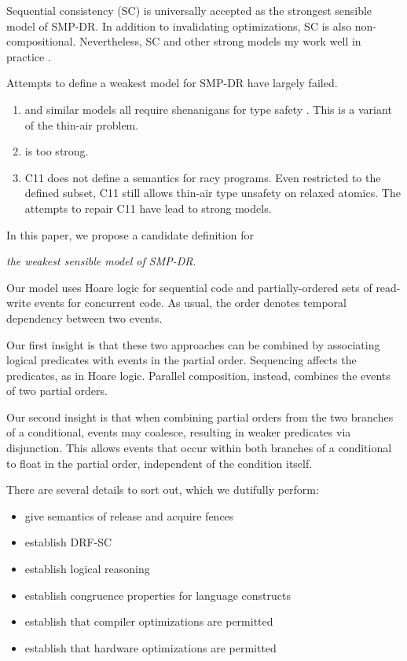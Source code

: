 Sequential consistency (SC) \citep{Lamport:1979:MMC:1311099.1311750} is
universally accepted as the strongest sensible model of SMP-DR.  In addition
to invalidating optimizations, SC is also non-compositional.  Nevertheless,
SC and other strong models my work well in practice
\cite{Singh:2012:ESC:2337159.2337220,Dolan:2018:BDR:3192366.3192421,Ou:2018:TUC:3288538.3276506,Liu:2019:ASC:3314221.3314611}.

Attempts to define a weakest model for SMP-DR have largely failed.
\begin{enumerate}
\item \citet{Manson:2005:JMM:1047659.1040336} and similar models
  \cite{DBLP:conf/esop/JagadeesanPR10,DBLP:conf/popl/KangHLVD17} all require
  shenanigans for type safety
  \cite{DBLP:journals/toplas/Lochbihler13,DBLP:conf/tldi/GotoJPR12}.  This is
  a variant of the thin-air problem.
\item \citet{DBLP:conf/lics/JeffreyR16} is too strong.
\item C11 does not define a semantics for racy programs.  Even restricted to
  the defined subset, C11 still allows thin-air type unsafety on relaxed
  atomics. The attempts to repair C11 have lead to strong models.
\end{enumerate}

In this paper, we propose a candidate definition for
\begin{center}
  \emph{the weakest sensible model of SMP-DR}.
\end{center}

Our model uses Hoare logic for sequential code and partially-ordered sets of
read-write events for concurrent code.  As usual, the order denotes temporal
dependency between two events.

Our first insight is that these two approaches can be combined by associating
logical predicates with events in the partial order.  Sequencing affects the
predicates, as in Hoare logic.  Parallel composition, instead, combines the
events of two partial orders.

Our second insight is that when combining partial orders from the two
branches of a conditional, events may coalesce, resulting in weaker
predicates via disjunction.  This allows events that occur within both
branches of a conditional to float in the partial order, independent of the
condition itself.

There are several details to sort out, which we dutifully perform:
\begin{itemize}
\item give semantics of release and acquire fences
\item establish DRF-SC
\item establish logical reasoning
\item establish congruence properties for language constructs
\item establish that compiler optimizations are permitted
\item establish that hardware optimizations are permitted
\end{itemize}

